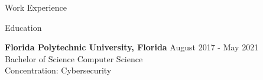 \documentclass{resume} %
\begin{document}
\begin{rSection}{Work Experience}
	\end{rSection}




\begin{rSection}{Education}

{\bf Florida Polytechnic University, Florida} \hfill { August 2017 - May 2021} 
\\ Bachelor of Science Computer Science\hfill %
\\ Concentration: Cybersecurity
\end{rSection}







\end{document}
